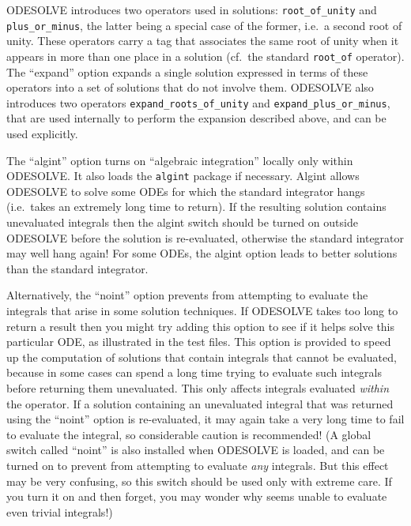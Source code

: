 \hypertarget{operator:ROOT_OF_UNITY}{}
\hypertarget{operator:PLUS_OR_MINUS}{}
ODESOLVE introduces two operators used in solutions:
\texttt{root\_of\_unity} and \texttt{plus\_or\_minus}, the latter
being a special case of the former, i.e.\ a second root of unity.
These operators carry a tag that associates the same root of unity
when it appears in more than one place in a solution (cf.\ the
standard \texttt{root\_of} operator).  The ``expand'' option expands a
single solution expressed in terms of these operators into a set of
solutions that do not involve them.  ODESOLVE also introduces two
operators \texttt{expand\_roots\_of\_unity} and
\texttt{expand\_plus\_or\_minus}, that are used internally to perform
the expansion described above, and can be used explicitly.

The ``algint'' option turns on ``algebraic integration'' locally only
within ODESOLVE.  It also loads the \texttt{algint} package if
necessary.  Algint allows ODESOLVE to solve some ODEs for which the
standard \REDUCE{} integrator hangs (i.e.\ takes an extremely long
time to return).  If the resulting solution contains unevaluated
integrals then the algint switch should be turned on outside ODESOLVE
before the solution is re-evaluated, otherwise the standard integrator
may well hang again!  For some ODEs, the algint option leads to better
solutions than the standard \REDUCE{} integrator.

Alternatively, the ``noint'' option prevents \REDUCE{} from attempting
to evaluate the integrals that arise in some solution techniques.  If
ODESOLVE takes too long to return a result then you might try adding
this option to see if it helps solve this particular ODE, as
illustrated in the test files.  This option is provided to speed up
the computation of solutions that contain integrals that cannot be
evaluated, because in some cases \REDUCE{} can spend a long time
trying to evaluate such integrals before returning them unevaluated.
This only affects integrals evaluated \emph{within} the \odesolve{}
operator.  If a solution containing an unevaluated integral that was
returned using the ``noint'' option is re-evaluated, it may again take
\REDUCE{} a very long time to fail to evaluate the integral, so
considerable caution is recommended!  (A global switch called
``noint'' is also installed when ODESOLVE is loaded, and can be
turned on to prevent \REDUCE{} from attempting to evaluate \emph{any}
integrals.  But this effect may be very confusing, so this switch
should be used only with extreme care.  If you turn it on and then
forget, you may wonder why \REDUCE{} seems unable to evaluate even
trivial integrals!)


